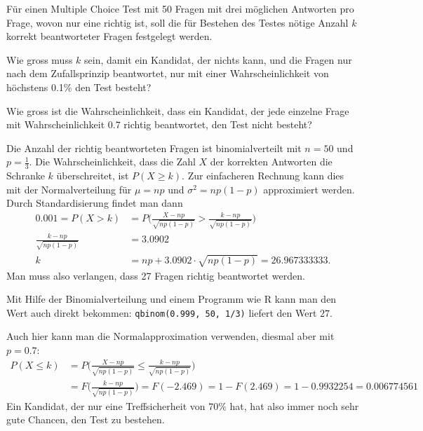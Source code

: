 Für einen Multiple Choice Test mit 50 Fragen mit drei möglichen Antworten
pro Frage, wovon nur eine richtig ist, soll die für
Bestehen des Testes nötige Anzahl $k$ korrekt beantworteter Fragen
festgelegt werden.
\begin{teilaufgaben}
\item Wie gross muss $k$ sein, damit ein Kandidat,
der nichts kann, und die Fragen nur nach dem Zufallsprinzip beantwortet,
nur mit einer Wahrscheinlichkeit von höchstens 0.1\% den Test besteht?
\item Wie gross ist die Wahrscheinlichkeit, dass ein Kandidat, der jede
einzelne Frage mit Wahrscheinlichkeit $0.7$ richtig beantwortet, den
Test nicht besteht?
\end{teilaufgaben}


\begin{loesung}
\begin{teilaufgaben}
\item Die Anzahl der richtig beantworteten Fragen ist binomialverteilt
mit $n=50$ und $p=\frac13$. Die Wahrscheinlichkeit, dass die Zahl $X$
der korrekten Antworten die Schranke $k$ überschreitet, ist $P(X\ge k)$.
Zur einfacheren Rechnung kann dies mit der Normalverteilung für
$\mu = np$ und $\sigma^2=np(1-p)$ approximiert werden. Durch Standardisierung
findet man dann
\begin{align*}
0.001=P(X>k)
&=
P\biggl(
\frac{X-np}{\sqrt{np(1-p)}}>\frac{k-np}{\sqrt{np(1-p)}}
\biggr)
\\
\frac{k-np}{\sqrt{np(1-p)}}&=3.0902
\\
k&= np+3.0902\cdot \sqrt{np(1-p)}
=26.967333333.
\end{align*}
Man muss also verlangen, dass 27 Fragen richtig beantwortet werden.

Mit Hilfe der Binomialverteilung und einem Programm wie R kann man den
Wert auch direkt bekommen:
\texttt{qbinom(0.999, 50, 1/3)}
liefert den Wert $27$.
\item
Auch hier kann man die Normalapproximation verwenden, diesmal aber mit
$p=0.7$:
\begin{align*}
P(X\le k)&=
P\biggl(
\frac{X-np}{\sqrt{np(1-p)}}\le\frac{k-np}{\sqrt{np(1-p)}}
\biggr)
\\
&=F\biggl(
\frac{k-np}{\sqrt{np(1-p)}}
\biggr)
=F(-2.469)=1-F(2.469)=1-0.9932254=0.006774561
\end{align*}
Ein Kandidat, der nur eine Treffsicherheit von $70\%$ hat, hat also
immer noch sehr gute Chancen, den Test zu bestehen.
\qedhere
\end{teilaufgaben}
\end{loesung}

